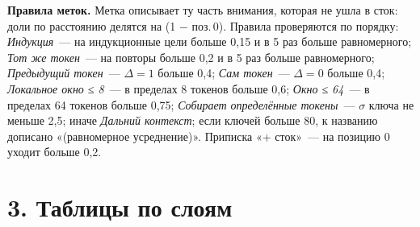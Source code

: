 \documentclass[10pt]{article}
\begin{document}
\textbf{Правила меток.} Метка описывает ту часть внимания, которая не ушла в сток: доли по расстоянию делятся на (1 $-$ поз.\,0). Правила проверяются по порядку: \emph{Индукция}~— на индукционные цели больше 0,15 и в 5 раз больше равномерного; \emph{Тот же токен}~— на повторы больше 0,2 и в 5 раз больше равномерного; \emph{Предыдущий токен}~— $\Delta{=}1$ больше 0,4; \emph{Сам токен}~— $\Delta{=}0$ больше 0,4; \emph{Локальное окно ≤ 8}~— в пределах 8 токенов больше 0,6; \emph{Окно ≤ 64}~— в пределах 64 токенов больше 0,75; \emph{Собирает определённые токены}~— $\sigma$ ключа не меньше 2,5; иначе \emph{Дальний контекст}; если ключей больше 80, к названию дописано «(равномерное усреднение)». Приписка «+ сток»~— на позицию 0 уходит больше 0,2.
\newpage
\section*{3. Таблицы по слоям}
\end{document}
